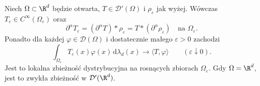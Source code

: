 \begin{twierdzenie}
\label{thm:pde7-mollify}
Niech $\Omega\subset\R^d$ będzie otwarta, $T\in\mathcal D'(\Omega)$
i $\rho_\varepsilon$ jak wyżej. Wówczas
$T_\varepsilon\in C^\infty(\Omega_\varepsilon)$ oraz
\begin{equation}\label{eq:pde7-deriv-mollify}
 \partial^\alpha T_\varepsilon
 =(\partial^\alpha T)*\rho_\varepsilon
 =T*(\partial^\alpha\rho_\varepsilon)
 \quad\text{na }\Omega_\varepsilon.
\end{equation}
Ponadto dla każdej $\varphi\in\mathcal D(\Omega)$
i dostatecznie małego $\varepsilon>0$ zachodzi
\[
 \int_{\Omega_\varepsilon}T_\varepsilon(x)\varphi(x)
 \,\mathrm d\lambda_d(x)
 \longrightarrow\langle T,\varphi\rangle
 \qquad(\varepsilon\downarrow0).
\]
Jest to lokalna zbieżność dystrybucyjna na rosnących
zbiorach $\Omega_\varepsilon$. Gdy $\Omega=\R^d$,
jest to zwykła zbieżność w $\mathcal D'(\R^d)$.
\end{twierdzenie}
